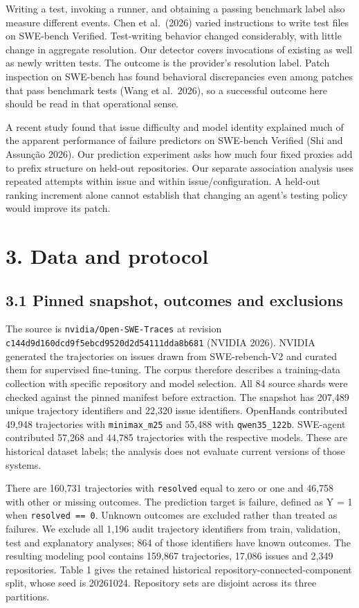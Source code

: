 \documentclass[10pt,a4paper]{article}
\begin{document}
Writing a test, invoking a runner, and obtaining a passing benchmark label also measure different events. Chen et al.\ (2026) varied instructions to write test files on SWE-bench Verified. Test-writing behavior changed considerably, with little change in aggregate resolution. Our detector covers invocations of existing as well as newly written tests. The outcome is the provider's resolution label. Patch inspection on SWE-bench has found behavioral discrepancies even among patches that pass benchmark tests (Wang et al.\ 2026), so a successful outcome here should be read in that operational sense.

A recent study found that issue difficulty and model identity explained much of the apparent performance of failure predictors on SWE-bench Verified (Shi and Assun\c{c}\~ao 2026). Our prediction experiment asks how much four fixed proxies add to prefix structure on held-out repositories. Our separate association analysis uses repeated attempts within issue and within issue/configuration. A held-out ranking increment alone cannot establish that changing an agent's testing policy would improve its patch.

\section{3. Data and protocol}
\subsection{3.1 Pinned snapshot, outcomes and exclusions}
The source is \texttt{nvidia/Open-SWE-Traces} at revision \nolinkurl{c144d9d160dcd9f5ebcd9520d2d54111dda8b681} (NVIDIA 2026). NVIDIA generated the trajectories on issues drawn from SWE-rebench-V2 and curated them for supervised fine-tuning. The corpus therefore describes a training-data collection with specific repository and model selection. All 84 source shards were checked against the pinned manifest before extraction. The snapshot has 207,489 unique trajectory identifiers and 22,320 issue identifiers. OpenHands contributed 49,948 trajectories with \texttt{minimax\_m25} and 55,488 with \texttt{qwen35\_122b}. SWE-agent contributed 57,268 and 44,785 trajectories with the respective models. These are historical dataset labels; the analysis does not evaluate current versions of those systems.

There are 160,731 trajectories with \texttt{resolved} equal to zero or one and 46,758 with other or missing outcomes. The prediction target is failure, defined as Y = 1 when \texttt{resolved == 0}. Unknown outcomes are excluded rather than treated as failures. We exclude all 1,196 audit trajectory identifiers from train, validation, test and explanatory analyses; 864 of those identifiers have known outcomes. The resulting modeling pool contains 159,867 trajectories, 17,086 issues and 2,349 repositories. Table 1 gives the retained historical repository-connected-component split, whose seed is 20261024. Repository sets are disjoint across its three partitions.
\end{document}
